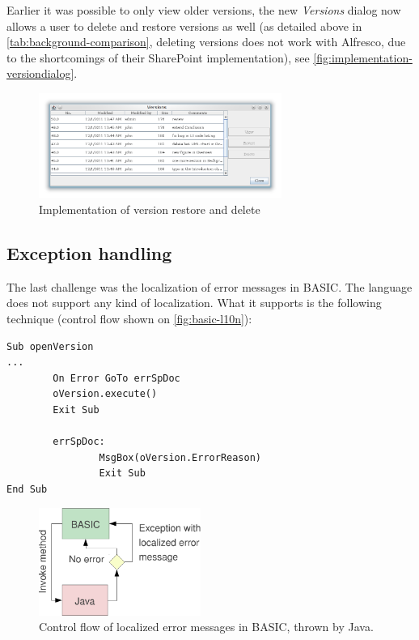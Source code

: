 Earlier it was possible to only view older versions, the new \emph{Versions}
dialog now allows a user to delete and restore versions as well (as detailed
above in \autoref{tab:background-comparison}, deleting versions does not work
with Alfresco, due to the shortcomings of their SharePoint implementation), see
\autoref{fig:implementation-versiondialog}.

\begin{figure}[H]
\centering
\includegraphics[width=300px,keepaspectratio]{implementation-versiondialog.png}
\caption{Implementation of version restore and delete}
\label{fig:implementation-versiondialog}
\end{figure}

\subsection{Exception handling}

The last challenge was the localization of error messages in BASIC. The
language does not support any kind of localization. What it supports is the
following technique (control flow shown on \autoref{fig:basic-l10n}):

\begin{lstlisting}
Sub openVersion
...
        On Error GoTo errSpDoc
        oVersion.execute()
        Exit Sub

        errSpDoc:
                MsgBox(oVersion.ErrorReason)
                Exit Sub
End Sub
\end{lstlisting}

\begin{figure}[H]
\centering
\includegraphics[width=200px,keepaspectratio]{basic-l10n.pdf}
\caption{Control flow of localized error messages in BASIC, thrown by Java.}
\label{fig:basic-l10n}
\end{figure}

